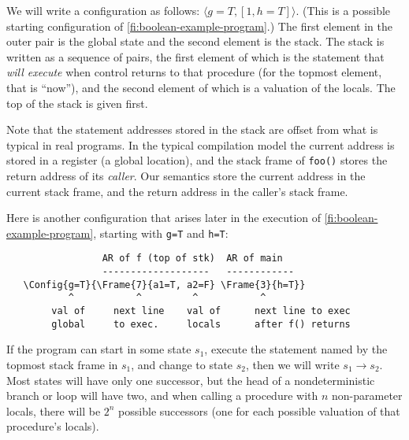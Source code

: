 \documentclass{article}
\newcommand{\Code}[1]{\texttt{#1}}
\newcommand{\Config}[2]{\ensuremath{\langle #1, #2 \rangle}}
\newcommand{\Frame}[2]{[#1, #2]}
\begin{document}
We will write a configuration as follows:
\Config{g=T}{\Frame{1}{h=T}}. (This is a possible starting
configuration of \cref{fi:boolean-example-program}.) The first element in
the outer pair is the global state and the second element is the
stack. The stack is written as a sequence of pairs, the first element
of which is the statement that \emph{will execute} when control
returns to that procedure (for the topmost element, that is ``now''),
and the second element of which is a valuation of the locals. The top
of the stack is given first.

Note that the statement addresses stored in the stack are offset from
what is typical in real programs. In the typical compilation model the
current address is
stored in a register (a global location), and the stack frame of
\Code{foo()} stores the return address of its \emph{caller}. Our
semantics store the current address in the current stack frame, and
the return address in the caller's stack frame\footnotemark.




Here is another configuration that arises later in the execution of
\cref{fi:boolean-example-program}, starting with \Code{g=T} and
\Code{h=T}:

\begin{minipage}{\textwidth}
\begin{verbatim}
                 AR of f (top of stk)  AR of main
                 -------------------   ------------
   \Config{g=T}{\Frame{7}{a1=T, a2=F} \Frame{3}{h=T}}
           ^           ^         ^           ^
        val of     next line    val of      next line to exec
        global     to exec.     locals      after f() returns
\end{verbatim}
\end{minipage}

If the program can start in some state $s_1$, execute the statement
named by the topmost stack frame in $s_1$, and change to state $s_2$,
then we will write $s_1 \rightarrow s_2$. Most states will have only
one successor, but the head of a nondeterministic branch or loop will
have two, and when calling a procedure with $n$ non-parameter locals,
there will be $2^n$ possible successors (one for each possible
valuation of that procedure's locals).
\end{document}
